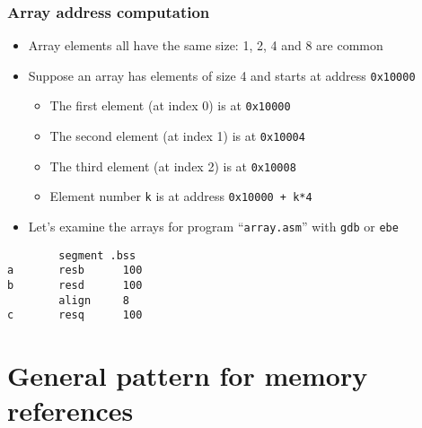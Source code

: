\documentclass{beamer}
\begin{document}
\begin{frame}[fragile]
    \frametitle{Array address computation}
    \begin{itemize}
        \item Array elements all have the same size: 1, 2, 4 and 8 are common
        \item Suppose an array has elements of size 4 and starts at address {\tt 0x10000}
        \begin{itemize}
            \item The first element (at index 0) is at {\tt 0x10000}
            \item The second element (at index 1) is at {\tt 0x10004}
            \item The third element (at index 2) is at {\tt 0x10008}
            \item Element number {\tt k} is at address {\tt 0x10000 + k*4}
        \end{itemize}
        \item Let's examine the arrays for program ``{\tt array.asm}''
              with {\tt gdb} or {\tt ebe}
    \end{itemize}
    \begin{verbatim}
        segment .bss
a       resb      100
b       resd      100
        align     8
c       resq      100
    \end{verbatim}
\end{frame}

\section{General pattern for memory references}
\end{document}
